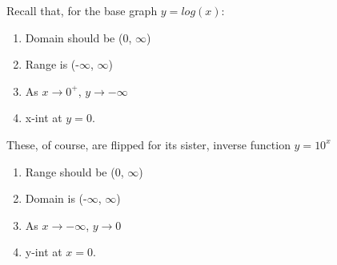 \documentclass[letterpaper]{article}
\begin{document}
Recall that, for the base graph \(y=log(x)\):

\begin{enumerate}
\item Domain should be (0, \(\infty\))
\item Range is (-\(\infty\), \(\infty\))
\item As \(x \to 0^+\), \(y \to -\infty\)
\item x-int at \(y=0\).
\end{enumerate}

These, of course, are flipped for its sister, inverse function
\(y=10^x\)

\begin{enumerate}
\item Range should be (0, \(\infty\))
\item Domain is (-\(\infty\), \(\infty\))
\item As \(x\to-\infty\), \(y\to0\)
\item y-int at \(x=0\).
\end{enumerate}
\end{document}
